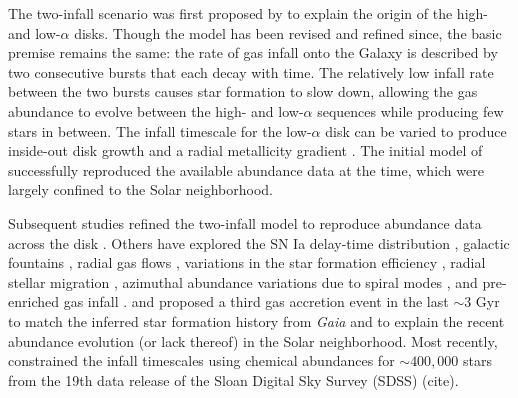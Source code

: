 \documentclass[twocolumn,twocolappendix,linenumbers]{aastex631}
\newcommand{\todo}[1]{{\color{red}#1}}
\begin{document}
The two-infall scenario was first proposed by \citet{chiappini_chemical_1997} to explain the origin of the high- and low-$\alpha$ disks. Though the model has been revised and refined since, the basic premise remains the same: the rate of gas infall onto the Galaxy is described by two consecutive bursts that each decay with time. The relatively low infall rate between the two bursts causes star formation to slow down, allowing the gas abundance to evolve between the high- and low-$\alpha$ sequences while producing few stars in between. 
The infall timescale for the low-$\alpha$ disk can be varied to produce inside-out disk growth and a radial metallicity gradient \citep{romano_mass_2000}.
The initial model of \citet{chiappini_chemical_1997} successfully reproduced the available abundance data at the time, which were largely confined to the Solar neighborhood.

Subsequent studies refined the two-infall model to reproduce abundance data across the disk \citep[e.g.,][]{chiappini_abundance_2001,chiappini_oxygen_2003}. Others have explored the SN Ia delay-time distribution \citep{matteucci_effect_2009,palicio_analytic_2023}, galactic fountains \citep{spitoni_effects_2009}, radial gas flows \citep{spitoni_effects_2011,palla_chemical_2020}, variations in the star formation efficiency \citep{spitoni_effects_2011,palla_chemical_2020}, radial stellar migration \citep{spitoni_effect_2015,palla_mgfe_2022}, azimuthal abundance variations due to spiral modes \citep{spitoni_2d_2019}, and pre-enriched gas infall \citep{palla_chemical_2020,spitoni_remind_2024}. \citet{spitoni_beyond_2023} and \citet{palla_mapping_2024} proposed a third gas accretion event in the last $\sim3$ Gyr to match the inferred star formation history from {\it Gaia} \citep{ruiz-lara_recurrent_2020} and to explain the recent abundance evolution (or lack thereof) in the Solar neighborhood. Most recently, \citet{hegedus_reconstructing_2025} constrained the infall timescales using chemical abundances for $\sim400,000$ stars from the 19th data release of the Sloan Digital Sky Survey (SDSS) \todo{(cite)}.
\end{document}
